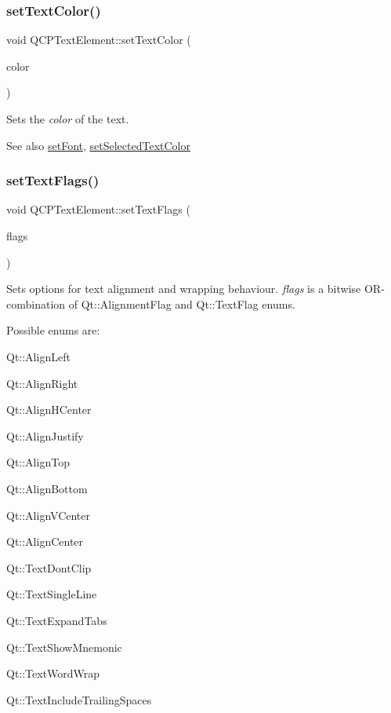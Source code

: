 \subsubsection{\texorpdfstring{set\+Text\+Color()}{setTextColor()}}
{\footnotesize\ttfamily void Q\+C\+P\+Text\+Element\+::set\+Text\+Color (\begin{DoxyParamCaption}\item[{const Q\+Color \&}]{color }\end{DoxyParamCaption})}

Sets the {\itshape color} of the text.

\begin{DoxySeeAlso}{See also}
\hyperlink{class_q_c_p_text_element_a09b3241769528fa87cb4bf35c97defad}{set\+Font}, \hyperlink{class_q_c_p_text_element_abaec200cae70a0eade53583defc0476d}{set\+Selected\+Text\+Color} 
\end{DoxySeeAlso}
\mbox{\label{class_q_c_p_text_element_ab908f437f552020888a3ad8cf8242605}} 
\subsubsection{\texorpdfstring{set\+Text\+Flags()}{setTextFlags()}}
{\footnotesize\ttfamily void Q\+C\+P\+Text\+Element\+::set\+Text\+Flags (\begin{DoxyParamCaption}\item[{int}]{flags }\end{DoxyParamCaption})}

Sets options for text alignment and wrapping behaviour. {\itshape flags} is a bitwise O\+R-\/combination of {\ttfamily Qt\+::\+Alignment\+Flag} and {\ttfamily Qt\+::\+Text\+Flag} enums.

Possible enums are\+:
\begin{DoxyItemize}
\item Qt\+::\+Align\+Left
\item Qt\+::\+Align\+Right
\item Qt\+::\+Align\+H\+Center
\item Qt\+::\+Align\+Justify
\item Qt\+::\+Align\+Top
\item Qt\+::\+Align\+Bottom
\item Qt\+::\+Align\+V\+Center
\item Qt\+::\+Align\+Center
\item Qt\+::\+Text\+Dont\+Clip
\item Qt\+::\+Text\+Single\+Line
\item Qt\+::\+Text\+Expand\+Tabs
\item Qt\+::\+Text\+Show\+Mnemonic
\item Qt\+::\+Text\+Word\+Wrap
\item Qt\+::\+Text\+Include\+Trailing\+Spaces 
\end{DoxyItemize}

